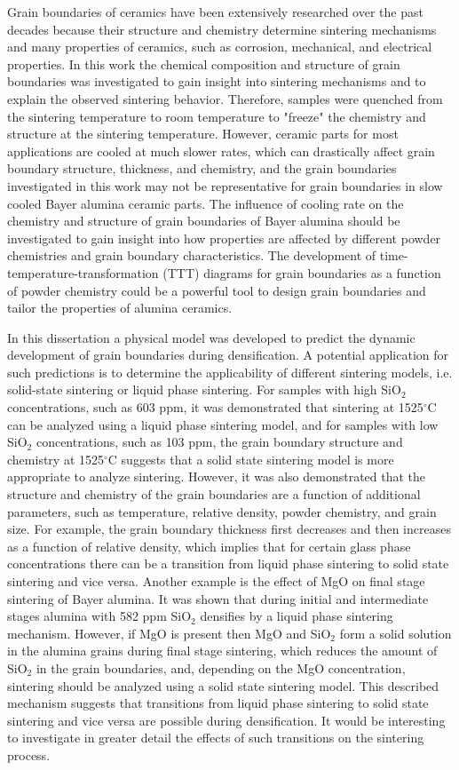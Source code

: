 Grain boundaries of ceramics have been extensively researched over the past decades because their structure and chemistry determine sintering mechanisms and many properties of ceramics, such as corrosion, mechanical, and electrical properties. In this work the chemical composition and structure of grain boundaries was investigated to gain insight into sintering mechanisms and to explain the observed sintering behavior. Therefore, samples were quenched from the sintering temperature to room temperature to "freeze" the chemistry and structure at the sintering temperature. However, ceramic parts for most applications are cooled at much slower rates, which can drastically affect grain boundary structure, thickness, and chemistry, and the grain boundaries investigated in this work may not be representative for grain boundaries in slow cooled Bayer alumina ceramic parts. The influence of cooling rate on the chemistry and structure of grain boundaries of Bayer alumina should be investigated to gain insight into how properties are affected by different powder chemistries and grain boundary characteristics. The development of time-temperature-transformation (TTT) diagrams for grain boundaries \cite{Cantwell2016} as a function of powder chemistry could be a powerful tool to design grain boundaries and tailor the properties of alumina ceramics. 

In this dissertation a physical model was developed to predict the dynamic development of grain boundaries during densification. A potential application for such predictions is to determine the applicability of different sintering models, i.e. solid-state sintering or liquid phase sintering. For samples with high SiO$_{2}$ concentrations, such as 603 ppm, it was demonstrated that sintering at 1525$^{\circ}$C can be analyzed using a liquid phase sintering model, and for samples with low SiO$_{2}$ concentrations, such as 103 ppm, the grain boundary structure and chemistry at 1525$^{\circ}$C suggests that a solid state sintering model is more appropriate to analyze sintering. However, it was also demonstrated that the structure and chemistry of the grain boundaries are a function of additional parameters, such as temperature, relative density, powder chemistry, and grain size. For example, the grain boundary thickness first decreases and then increases as a function of relative density, which implies that for certain glass phase concentrations there can be a transition from liquid phase sintering to solid state sintering and vice versa. Another example is the effect of MgO on final stage sintering of Bayer alumina. It was shown that during initial and intermediate stages alumina with 582 ppm SiO$_{2}$ densifies by a liquid phase sintering mechanism. However, if MgO is present then MgO and SiO$_{2}$ form a solid solution in the alumina grains during final stage sintering, which reduces the amount of SiO$_{2}$ in the grain boundaries, and, depending on the MgO concentration, sintering should be analyzed using a solid state sintering model. This described mechanism suggests that transitions from liquid phase sintering to solid state sintering and vice versa are possible during densification. It would be interesting to investigate in greater detail the effects of such transitions on the sintering process. 
